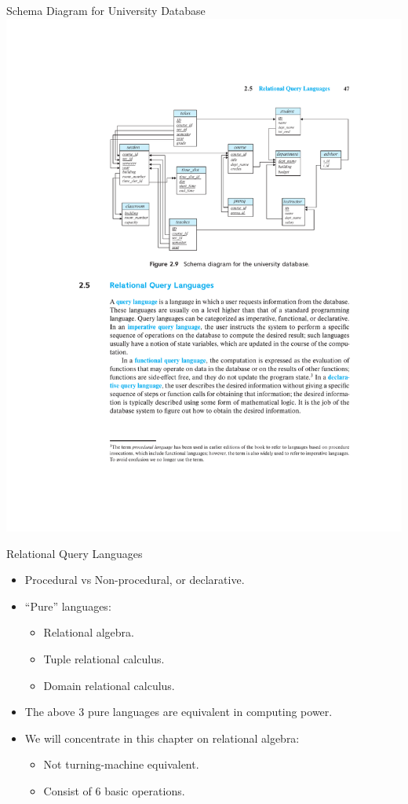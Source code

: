 \documentclass{beamer}
\begin{document}
\begin{frame}{Schema Diagram for University Database}
    \centering
    \includegraphics[width=\textwidth, trim={5.50cm 15.30cm 2.90cm 4.85cm}, clip]{figures/db_schema}
\end{frame}

\begin{frame}{Relational Query Languages}
    \begin{itemize}
        \item Procedural vs Non-procedural, or declarative.
        \item ``Pure'' languages:
        \begin{itemize}
            \item Relational algebra.
            \item Tuple relational calculus.
            \item Domain relational calculus.
        \end{itemize}
        \item The above 3 pure languages are equivalent in computing power.
        \item We will concentrate in this chapter on relational algebra:
        \begin{itemize}
            \item Not turning-machine equivalent.
            \item Consist of 6 basic operations.
        \end{itemize}
    \end{itemize}
\end{frame}
\end{document}
